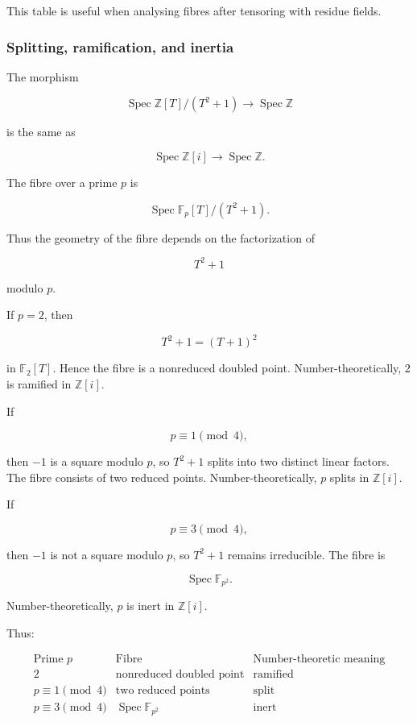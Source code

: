 \documentclass[12pt,a4paper]{article}
\theoremstyle{notespace}
\begin{document}
This table is useful when analysing fibres after tensoring with residue fields.

\subsubsection{Splitting, ramification, and inertia}

The morphism

\[
\operatorname{Spec}\mathbb{Z}[T]/(T^2+1)
\to
\operatorname{Spec}\mathbb{Z}
\]

is the same as

\[
\operatorname{Spec}\mathbb{Z}[i]
\to
\operatorname{Spec}\mathbb{Z}.
\]

The fibre over a prime \(p\) is

\[
\operatorname{Spec}\mathbb{F}_p[T]/(T^2+1).
\]

Thus the geometry of the fibre depends on the factorization of

\[
T^2+1
\]

modulo \(p\).

If \(p=2\), then

\[
T^2+1=(T+1)^2
\]

in \(\mathbb{F}_2[T]\). Hence the fibre is a nonreduced doubled point. Number-theoretically, \(2\) is ramified in \(\mathbb{Z}[i]\).

If

\[
p\equiv 1\pmod 4,
\]

then \(-1\) is a square modulo \(p\), so \(T^2+1\) splits into two distinct linear factors. The fibre consists of two reduced points. Number-theoretically, \(p\) splits in \(\mathbb{Z}[i]\).

If

\[
p\equiv 3\pmod 4,
\]

then \(-1\) is not a square modulo \(p\), so \(T^2+1\) remains irreducible. The fibre is

\[
\operatorname{Spec}\mathbb{F}_{p^2}.
\]

Number-theoretically, \(p\) is inert in \(\mathbb{Z}[i]\).

Thus:

\[
\begin{array}{c|c|c}
	\text{Prime }p & \text{Fibre} & \text{Number-theoretic meaning} \\
	\hline
	2 & \text{nonreduced doubled point} & \text{ramified} \\
	p\equiv 1\pmod 4 & \text{two reduced points} & \text{split} \\
	p\equiv 3\pmod 4 & \operatorname{Spec}\mathbb{F}_{p^2} & \text{inert}
\end{array}
\]
\end{document}
